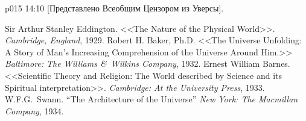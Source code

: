 \vsetoff
\vs p015 14:10 [Представлено Всеобщим Цензором из Уверсы]. 
\quizlink
\begin{thebibliography}{100}
Sir Arthur Stanley Eddington.
{<<The Nature of the Physical World>>.}
{\em Cambridge, England}, 1929.
Robert H. Baker, Ph.D.
{<<The Universe Unfolding: A Story of Man's Increasing Comprehension of the Universe Around Him.>>}
{\em Baltimore: The Williams \&\ Wilkins Company}, 1932.
Ernest William Barnes.
{<<Scientific Theory and Religion: The World described by Science and its Spiritual interpretation>>.}
{\em Cambridge: At the University Press}, 1933.
W.F.G.~Swann.
{``The Architecture of the Universe''}
{\em New York: The Macmillan Company}, 1934.
\end{thebibliography}
